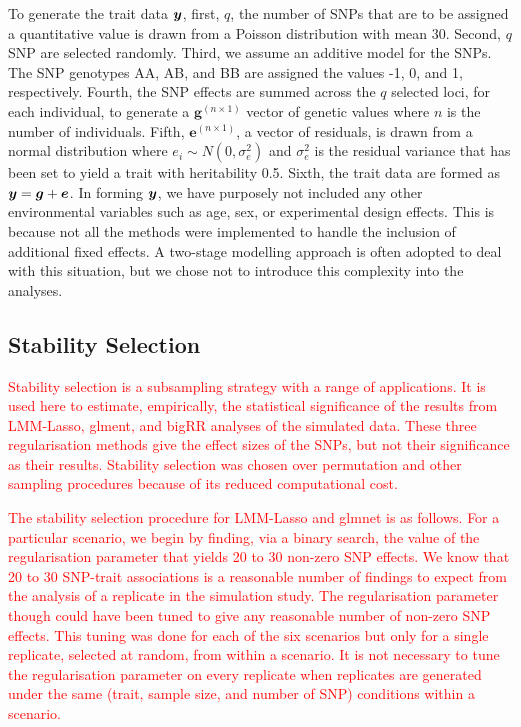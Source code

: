 \documentclass{article}
\begin{document}
To generate the trait data $\bm{y}$, first, $q$, the number of SNPs that are to be assigned a quantitative value is drawn from a Poisson distribution with 
mean 30. Second, $q$ SNP are selected randomly. Third, we assume an additive model for the SNPs. The SNP genotypes AA, AB, and BB 
are assigned the values -1, 0, and 1, respectively. Fourth, the SNP effects are summed across the $q$ selected loci, for each individual, to 
generate a $\bm{g}^{(n \times 1)}$ vector of genetic values where $n$ is the number of individuals. 
Fifth, $\bm{e}^{(n \times 1)}$, a vector of residuals, is drawn from a normal distribution where $e_i \sim N(0, \sigma^2_e)$ and $\sigma^2_e$ is 
the residual variance that has been set to yield a trait with heritability 0.5. Sixth,  the trait data are formed as $\bm{y} =  \bm{g} + \bm{e}$.  
In forming $\bm{y}$, we have purposely not included any other environmental variables such as age, sex, or experimental design effects. This is because 
not all the methods were implemented to handle the inclusion of additional fixed effects. A two-stage modelling approach 
is often adopted to deal with this situation, but we chose not to introduce this complexity into the analyses.  




\subsection{Stability Selection}

 
 \textcolor{red}{Stability selection  \citep{meinshausen2010stability}  is a subsampling strategy with a range of applications. 
 It is used here to estimate, empirically, the statistical significance of the results from LMM-Lasso, glment, and bigRR analyses 
 of the simulated data. These three regularisation methods give the effect sizes of the SNPs, but not their significance as their 
 results.   Stability selection was chosen over permutation and other sampling procedures because of its reduced computational cost. 
 }
 
 \textcolor{red}{
The stability selection procedure for LMM-Lasso and glmnet is as follows. 
For a particular scenario, we begin by finding, via a binary search,  
the value of the regularisation parameter that yields 20 to 30 non-zero SNP effects. 
We know that 20 to 30 SNP-trait associations is a reasonable number of findings to expect from the analysis of a replicate in the simulation study.  The regularisation parameter though could have been tuned to give any reasonable number of non-zero SNP effects. 
 This tuning was done for each of the six scenarios 
 but only for a single replicate, selected at random,  from within a scenario. It is not necessary to tune the regularisation parameter on every replicate 
 when replicates are generated under the same (trait, sample size, and number of SNP) conditions within a scenario. 
 }
 
\end{document}
